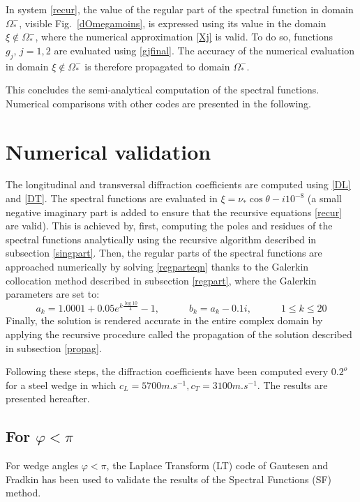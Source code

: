 In system \eqref{recur}, the value of the regular part of the spectral function in domain $\Omega_*^-$, visible Fig.~\ref{dOmegamoins}, is expressed using its value in the domain $\xi \notin \Omega_*^-$, where the numerical approximation \eqref{Xj} is valid. To do so, functions $g_j,\, j=1,2$ are evaluated using \eqref{gjfinal}. The accuracy of the numerical evaluation in domain $\xi \notin \Omega_*^-$ is therefore propagated to domain $\Omega_*^-$. 

This concludes the semi-analytical computation of the spectral functions. Numerical comparisons with other codes are presented in the following.


\section{Numerical validation}
The longitudinal and transversal diffraction coefficients are computed using \eqref{DL} and \eqref{DT}. The spectral functions are evaluated in $\xi=\nu_*\cos\theta -i10^{-8}$ (a small negative imaginary part is added to ensure that the recursive equations \eqref{recur} are valid). This is achieved by, first, computing the poles and residues of the spectral functions analytically using the recursive algorithm described in subsection \ref{singpart}. Then, the regular parts of the spectral functions are approached numerically by solving \eqref{regparteqn} thanks to the Galerkin collocation method described in subsection \ref{regpart}, where the Galerkin parameters are set to:
\begin{equation}
a_k=1.0001+0.05e^{k\frac{\log 10}{4}}-1, \hspace{3em} b_k=a_k-0.1i, \hspace{3em} 1\leq k\leq20
\end{equation}
Finally, the solution is rendered accurate in the entire complex domain by applying the recursive procedure called the propagation of the solution described in subsection \ref{propag}.

Following these steps, the diffraction coefficients have been computed every $0.2 ^o$ for a steel wedge in which $c_L=5700 m.s^{-1}, c_T=3100 m.s^{-1}$. The results are presented hereafter.
\subsection{For $\varphi<\pi$}
For wedge angles $\varphi<\pi$, the Laplace Transform (LT) code of Gautesen and Fradkin \cite{GautesenFradkin} has been used to validate the results of the Spectral Functions (SF) method. 

